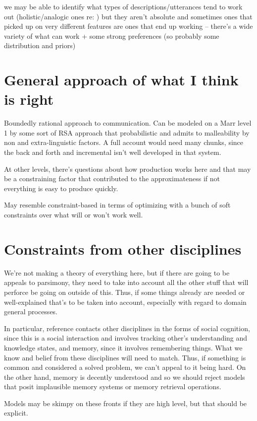 \documentclass[]{article}
\begin{document}
we may be able to identify what types of descriptions/utterances tend to work out (holistic/analogic ones re: \cite{clark1986}) but they aren't absolute and sometimes ones that picked up on very different features are ones that end up working -- there's a wide variety of what can work + some strong preferences (so probably some distribution and priors) 

\section{General approach of what I think is right}
Boundedly rational approach to communication. Can be modeled on a Marr level 1 by some sort of RSA approach that probabilistic and admits to malleability by non and extra-linguistic factors. A full account would need many chunks, since the back and forth and incremental isn't well developed in that system. 

At other levels, there's questions about how production works here and that may be a constraining factor that contributed to the approximateness if not everything is easy to produce quickly. 

May resemble constraint-based in terms of optimizing with a bunch of soft constraints over what will or won't work well. 

\section{Constraints from other disciplines}
We're not making a theory of everything here, but if there are going to be appeals to parsimony, they need to take into account all the other stuff that will perforce be going on outside of this. Thus, if some things already are needed or well-explained that's to be  taken into account, especially with regard to domain general processes. 

In particular, reference contacts other disciplines in the forms of social cognition, since this is a social interaction and involves tracking other's understanding and knowledge states, and memory, since it involves remembering things. What we know and belief from these disciplines will need to match. Thus, if something is common and considered a solved problem, we can't appeal to it being hard. On the other hand, memory is decently understood and so we should reject models that posit implausible memory systems or memory retrieval operations. 

Models may be skimpy on these fronts if they are high level, but that should be explicit. 
\end{document}
